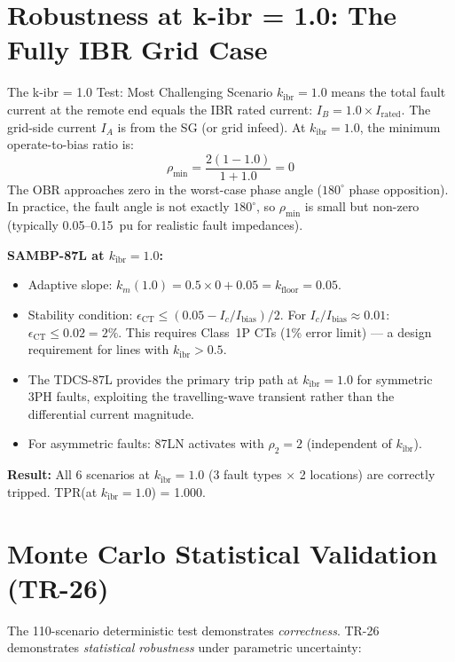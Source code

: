 \documentclass[12pt,a4paper]{article}
\newcommand{\kibr}{k_\mathrm{ibr}}
\begin{document}
\section{Robustness at k-ibr = 1.0: The Fully IBR Grid Case}

\begin{keybox}{The k-ibr = 1.0 Test: Most Challenging Scenario}
$\kibr = 1.0$ means the total fault current at the remote end equals the IBR rated current: $I_B = 1.0 \times I_\mathrm{rated}$. The grid-side current $I_A$ is from the SG (or grid infeed). At $\kibr = 1.0$, the minimum operate-to-bias ratio is:
\[
  \rho_\mathrm{min} = \frac{2(1-1.0)}{1+1.0} = 0
\]
The OBR approaches zero in the worst-case phase angle ($180^\circ$ phase opposition). In practice, the fault angle is not exactly $180^\circ$, so $\rho_\mathrm{min}$ is small but non-zero (typically 0.05--0.15~pu for realistic fault impedances).

\textbf{SAMBP-87L at $\kibr = 1.0$:}
\begin{itemize}[nosep]
  \item Adaptive slope: $k_m(1.0) = 0.5 \times 0 + 0.05 = k_\mathrm{floor} = 0.05$.
  \item Stability condition: $\epsilon_\mathrm{CT} \leq (0.05 - I_c/I_\mathrm{bias})/2$. For $I_c/I_\mathrm{bias} \approx 0.01$: $\epsilon_\mathrm{CT} \leq 0.02 = 2\%$. This requires Class~1P CTs (1\% error limit) --- a design requirement for lines with $\kibr > 0.5$.
  \item The TDCS-87L provides the primary trip path at $\kibr = 1.0$ for symmetric 3PH faults, exploiting the travelling-wave transient rather than the differential current magnitude.
  \item For asymmetric faults: 87LN activates with $\rho_2 = 2$ (independent of $\kibr$).
\end{itemize}
\textbf{Result:} All 6 scenarios at $\kibr = 1.0$ (3 fault types $\times$ 2 locations) are correctly tripped. TPR(at $\kibr = 1.0$) = 1.000.
\end{keybox}

\section{Monte Carlo Statistical Validation (TR-26)}

The 110-scenario deterministic test demonstrates \emph{correctness}. TR-26 demonstrates \emph{statistical robustness} under parametric uncertainty:
\end{document}
